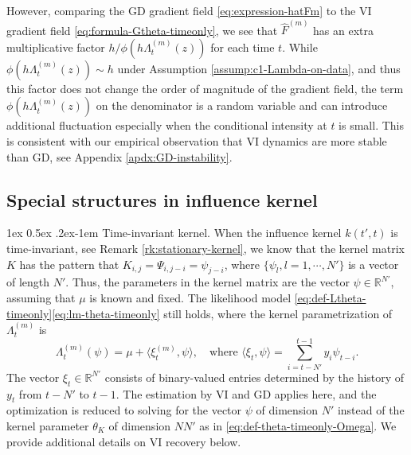\documentclass[11pt]{article}
\makeatletter
\theoremstyle{remark}
\theoremstyle{plain}
\newcommand{\R}{\mathbb{R}}
\renewcommand{\paragraph}{%
  \@startsection{paragraph}{4}%
  {\z@}{1ex \@plus 0.5ex \@minus .2ex}{-1em}%
  {\normalfont\normalsize\itshape}%
}
\makeatother
\begin{document}
 However, comparing the GD gradient field \eqref{eq:expression-hatFm} to the VI gradient field \eqref{eq:formula-Gtheta-timeonly}, we see that $\hat F^{(m)}$ has an extra multiplicative factor ${ h}/{ \phi( h  \Lambda_t^{(m)}( z) )} $ for each time $t$. While $\phi( h  \Lambda_t^{(m)}( z) ) \sim h$ under Assumption \ref{assump:c1-Lambda-on-data}, and thus this factor does not change the order of magnitude of the gradient field, the term $\phi( h  \Lambda_t^{(m)}( z) )$ on the denominator is a random variable and can introduce additional fluctuation especially when the conditional intensity at $t$ is small. 
This is consistent with our empirical observation that VI dynamics are more stable than GD, see Appendix \ref{apdx:GD-instability}.





\subsection{Special structures in influence kernel}\label{subsec:special-structure-psi}


\paragraph{Time-invariant kernel.}
When the influence kernel $k(t',t)$ is time-invariant, see Remark \ref{rk:stationary-kernel}, we know that the kernel matrix $K$ has the pattern that $K_{i,j} = \Psi_{i, j-i} = \psi_{j-i}$, where $\{ \psi_l, l=1,\cdots, N' \}$ is a vector of length $N'$.  Thus, the parameters in the kernel matrix are the vector $\psi \in \R^{N'}$, assuming that $\mu$ is known and fixed.
%
The likelihood model  \eqref{eq:def-Ltheta-timeonly}\eqref{eq:lm-theta-timeonly} still holds, where the kernel parametrization of $\Lambda_t^{(m)}$ is 
\begin{equation}\label{eq:lambda-psi-para-stationary}
\Lambda_t^{(m)}(\psi)= \mu + \langle \xi_t^{(m)},  \psi \rangle,
\quad \text{where }
\langle \xi_t, \psi \rangle = \sum_{i = t-N'}^{t-1} y_i \psi_{t-i}.
\end{equation}
The vector $\xi_t \in \R^{N'}$ consists of binary-valued entries determined by the history of $y_t$ from $t-N'$ to $t-1$.
The estimation by VI and GD applies here, and the optimization is reduced to solving for the vector $\psi$ of dimension $N'$ instead of the kernel parameter $\theta_K $ of dimension $NN'$  as in \eqref{eq:def-theta-timeonly-Omega}.
We provide additional details on VI recovery below.
\end{document}

